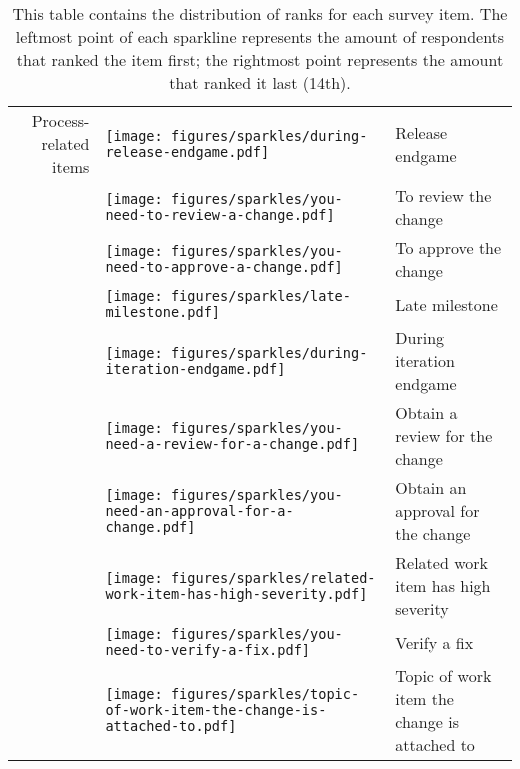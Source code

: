 \begin{table}[t!]
\centering
\caption{This table contains the distribution of ranks for each survey item. The leftmost point of each sparkline represents the amount of respondents that ranked the item first; the rightmost point represents the amount that ranked it last (14th).}
\begin{tabular}{rll}
\toprule
Process-related items &\vspace{-2pt}\texttt{[image: figures/sparkles/during-release-endgame.pdf]} & Release endgame\\
&\vspace{-2pt}\texttt{[image: figures/sparkles/you-need-to-review-a-change.pdf]} & To review the change\\
&\vspace{-2pt}\texttt{[image: figures/sparkles/you-need-to-approve-a-change.pdf]} & To approve the change\\
&\vspace{-2pt}\texttt{[image: figures/sparkles/late-milestone.pdf]} & Late milestone\\
&\vspace{-2pt}\texttt{[image: figures/sparkles/during-iteration-endgame.pdf]} & During iteration endgame\\
&\vspace{-2pt}\texttt{[image: figures/sparkles/you-need-a-review-for-a-change.pdf]} & Obtain a review for the change\\
&\vspace{-2pt}\texttt{[image: figures/sparkles/you-need-an-approval-for-a-change.pdf]} & Obtain an approval for the change\\
&\vspace{-2pt}\texttt{[image: figures/sparkles/related-work-item-has-high-severity.pdf]} & Related work item has high severity\\
&\vspace{-2pt}\texttt{[image: figures/sparkles/you-need-to-verify-a-fix.pdf]} & Verify a fix\\
&\vspace{-2pt}\texttt{[image: figures/sparkles/topic-of-work-item-the-change-is-attached-to.pdf]} & Topic of work item the change is attached to\\ 

\end{tabular}
\end{table}
